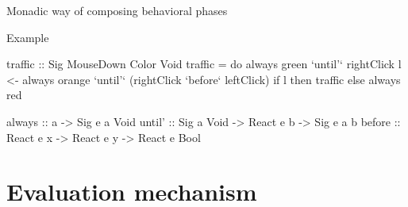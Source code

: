 \documentclass{beamer}
\begin{document}
\begin{frame}{Monadic way of composing behavioral phases}

\begin{block}{Example}
\vspace{-0.4cm}
\begin{center}
\end{center}
\vspace{-0.6cm}


\begin{code}
traffic :: Sig MouseDown Color Void
traffic = 
  do  always green `until'` rightClick
      l <- always orange `until'` (rightClick `before` leftClick)
      if l then traffic else always red
\end{code}
\begin{code}
always  :: a -> Sig e a Void
until'  :: Sig a Void -> React e b -> Sig e a b
before  :: React e x -> React e y -> React e Bool
\end{code}
\setlength{\mathindent}{\tmathindenta}
\vspace{-0.8cm}
\end{block}
\end{frame}


\section{Evaluation mechanism}
\end{document}
